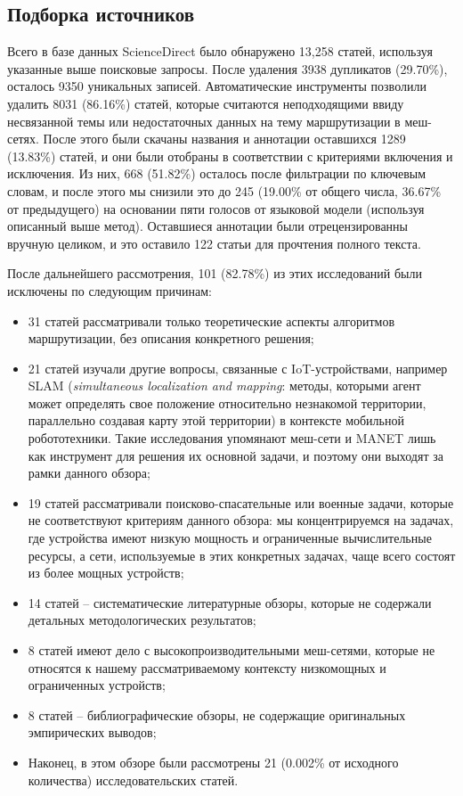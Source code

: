 \documentclass[%
]{report}
\begin{document}
\subsection{Подборка источников}\label{selection-of-sources-of-evidence-1}

Всего в базе данных ScienceDirect было обнаружено 13,258 статей,
используя указанные выше поисковые запросы.
После удаления 3938 дупликатов (29.70\%),
осталось 9350 уникальных записей.
Автоматические инструменты позволили удалить
8031 (86.16\%) статей,
которые считаются неподходящими
ввиду несвязанной темы или
недостаточных данных на тему маршрутизации в меш-сетях.
После этого были скачаны названия и аннотации
оставшихся 1289 (13.83\%) статей,
и они были отобраны в соответствии с
критериями включения и исключения.
Из них, 668 (51.82\%)
осталось после фильтрации по ключевым словам,
и после этого мы снизили это до
245 (19.00\% от общего числа, 36.67\% от предыдущего)
на основании пяти голосов от языковой модели
(используя описанный выше метод).
Оставшиеся аннотации были отрецензированны вручную целиком,
и это оставило 122 статьи для прочтения полного текста.

После дальнейшего рассмотрения, 101 (82.78\%) из этих исследований
были исключены по следующим причинам:

\begin{itemize}
\item
  31 статей рассматривали только теоретические аспекты
  алгоритмов маршрутизации, без описания конкретного решения;
\item
  21 статей изучали другие вопросы, связанные с IoT-устройствами,
  например SLAM (\emph{simultaneous localization and mapping}: методы,
  которыми агент может
  определять свое положение относительно незнакомой территории,
  параллельно создавая карту этой территории) в 
  контексте мобильной робототехники.
  Такие исследования упомянают меш-сети и MANET
  лишь как инструмент для решения их основной задачи,
  и поэтому они выходят за рамки данного обзора;
\item
  19 статей рассматривали поисково-спасательные
  или военные задачи,
  которые не соответствуют критериям данного обзора:
  мы концентрируемся на задачах, где устройства имеют низкую мощность
  и ограниченные вычислительные ресурсы,
  а сети, используемые в этих конкретных задачах,
  чаще всего состоят из более мощных устройств;
\item
  14 статей -- систематические литературные обзоры,
  которые не содержали детальных методологических результатов;
\item
  8 статей имеют дело с высокопроизводительными меш-сетями,
  которые не относятся к нашему рассматриваемому контексту
  низкомощных и ограниченных устройств;
\item
  8 статей -- библиографические обзоры,
  не содержащие оригинальных эмпирических выводов;
\item
  Наконец, в этом обзоре были рассмотрены 21 (0.002\% от исходного количества)
  исследовательских статей.
\end{itemize}
\end{document}
